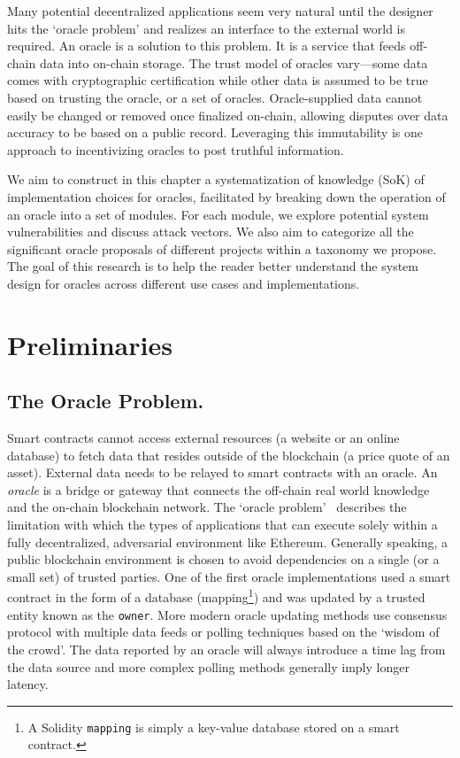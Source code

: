 Many potential decentralized applications seem very natural until the designer hits the `oracle problem' and realizes an interface to the external world is required. An oracle is a solution to this problem. It is a service that feeds off-chain data into on-chain storage. The trust model of oracles vary---some data comes with cryptographic certification while other data is assumed to be true based on trusting the oracle, or a set of oracles. Oracle-supplied data cannot easily be changed or removed once finalized on-chain, allowing disputes over data accuracy to be based on a public record. Leveraging this immutability is one approach to incentivizing oracles to post truthful information.

We aim to construct in this chapter a systematization of knowledge (SoK) of implementation choices for oracles, facilitated by breaking down the operation of an oracle into a set of modules. For each module, we explore potential system vulnerabilities and discuss attack vectors. We also aim to categorize all the significant oracle proposals of different projects within a taxonomy we propose. The goal of this research is to help the reader better understand the system design for oracles across different use cases and implementations.


\section{Preliminaries}



\subsection{The Oracle Problem.}  

Smart contracts cannot access external resources (\eg a website or an online database) to fetch data that resides outside of the blockchain (\eg a price quote of an asset). External data needs to be relayed to smart contracts with an oracle. An \emph{oracle} is a bridge or gateway that connects the off-chain real world knowledge and the on-chain blockchain network. The `oracle problem'~\cite{linkOracleProblem} describes the limitation with which the types of applications that can execute solely within a fully decentralized, adversarial environment like Ethereum. Generally speaking, a public blockchain environment is chosen to avoid dependencies on a single (or a small set) of trusted parties. One of the first oracle implementations used a smart contract in the form of a database (\ie mapping\footnote{A Solidity \texttt{mapping} is simply a key-value database stored on a smart contract.}) and was updated by a trusted entity known as the \texttt{owner}. More modern oracle updating methods use consensus protocol with multiple data feeds or polling techniques based on the `wisdom of the crowd'. The data reported by an oracle will always introduce a time lag from the data source and more complex polling methods generally imply longer latency.

